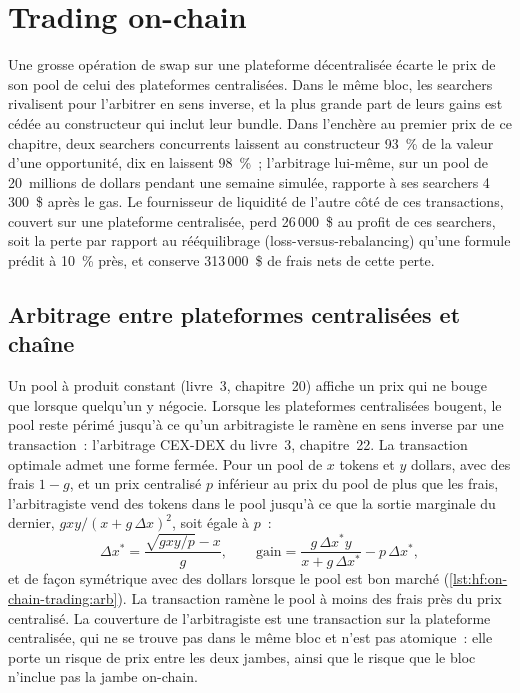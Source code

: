 \chapter{Trading on-chain}\label{ch:hf:on-chain-trading}

Une grosse opération de swap sur une plateforme décentralisée écarte le prix de son pool de celui des plateformes centralisées. Dans le même bloc, les searchers rivalisent
pour l'arbitrer en sens inverse, et la plus grande part de leurs gains est cédée au constructeur qui inclut leur bundle. Dans l'enchère au premier prix de ce chapitre, deux
searchers concurrents laissent au constructeur 93~\% de la valeur d'une opportunité, dix en laissent 98~\%~; l'arbitrage lui-même, sur un pool de 20~millions de dollars pendant une
semaine simulée, rapporte à ses searchers 4\,300~\$ après le gas. Le fournisseur de liquidité de l'autre côté de ces transactions, couvert sur une plateforme centralisée,
perd 26\,000~\$ au profit de ces searchers, soit la perte par rapport au rééquilibrage (loss-versus-rebalancing) qu'une formule prédit à 10~\% près, et conserve 313\,000~\$ de frais nets de cette perte.

\section{Arbitrage entre plateformes centralisées et chaîne}

Un pool à produit constant (livre~3, chapitre~20) affiche un prix qui ne bouge que lorsque quelqu'un y négocie. Lorsque les plateformes centralisées
bougent, le pool reste périmé jusqu'à ce qu'un arbitragiste le ramène en sens inverse par une transaction~: l'arbitrage CEX-DEX du livre~3, chapitre~22. La transaction optimale
admet une forme fermée. Pour un pool de $x$ tokens et $y$ dollars, avec des frais $1-g$, et un prix centralisé $p$ inférieur au prix du pool de plus que les frais,
l'arbitragiste vend des tokens dans le pool jusqu'à ce que la sortie marginale du dernier, $gxy/(x+g\,\Delta x)^2$, soit égale à $p$~:
\[
\Delta x^\ast=\frac{\sqrt{gxy/p}-x}{g},\qquad\text{gain}=\frac{g\,\Delta x^\ast y}{x+g\,\Delta x^\ast}-p\,\Delta x^\ast,
\]
et de façon symétrique avec des dollars lorsque le pool est bon marché (\cref{lst:hf:on-chain-trading:arb}). La transaction ramène le pool à moins des frais
près du prix centralisé. La couverture de l'arbitragiste est une transaction sur la plateforme centralisée, qui ne se trouve pas dans le même bloc et n'est pas atomique~: elle porte un risque de prix
entre les deux jambes, ainsi que le risque que le bloc n'inclue pas la jambe on-chain.

